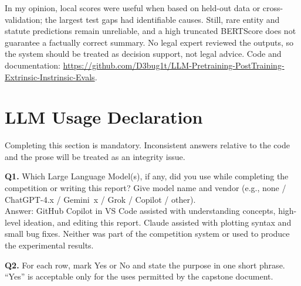 \documentclass[11pt, oneside]{article}
\begin{document}
In my opinion, local scores were useful when based on held-out data or cross-validation; the largest test gaps had
identifiable causes. Still, rare entity and statute predictions remain unreliable, and a high truncated BERTScore does not
guarantee a factually correct summary. No legal expert reviewed the outputs, so the system should be treated as
decision support, not legal advice. Code and documentation:
\url{https://github.com/D3bug1t/LLM-Pretraining-PostTraining-Extrinsic-Instrinsic-Evals}.

\clearpage
\section*{LLM Usage Declaration}
Completing this section is mandatory. Inconsistent answers relative to the code and the prose will be treated as an integrity issue.

\medskip
\noindent
\textbf{Q1.} Which Large Language Model(s), if any, did you use while completing the competition or writing this report? Give model name and vendor (e.g., none / ChatGPT-4.x / Gemini~x / Grok / Copilot / other). \\[0.6em]
Answer: GitHub Copilot in VS Code assisted with understanding concepts, high-level ideation, and editing this report.
Claude assisted with plotting syntax and small bug fixes. Neither was part of the competition system or used to produce the experimental results.

\medskip
\noindent
\textbf{Q2.} For each row, mark Yes or No and state the purpose in one short phrase. ``Yes'' is acceptable only for the uses permitted by the capstone document.
\end{document}
